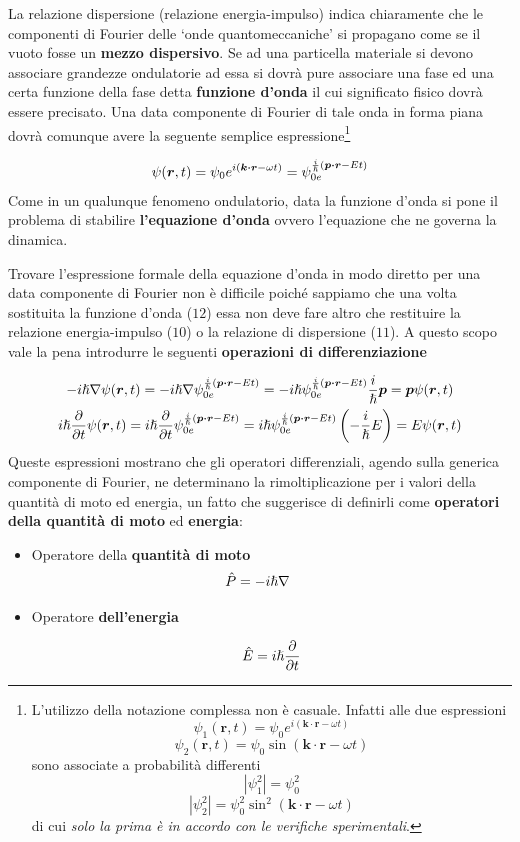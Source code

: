La relazione dispersione (relazione energia-impulso) indica chiaramente
che le componenti di Fourier delle `onde quantomeccaniche' si propagano
come se il vuoto fosse un \textbf{mezzo dispersivo}.
Se ad una particella materiale si devono associare grandezze ondulatorie
ad essa si dovrà pure associare una fase ed una certa funzione della
fase detta \textbf{funzione d'onda} il cui significato fisico dovrà
essere precisato.
Una data componente di Fourier di tale onda in forma
piana dovrà comunque avere la seguente semplice espressione\footnote{L'utilizzo
della notazione complessa non è casuale. Infatti alle due espressioni
	\[
		\psi_1(\bm{r},t) = \psi_0 e^{i(\bm{k \cdot r}-\omega t)}
	\] \[
		\psi_2(\bm{r},t) = \psi_0 \sin (\bm{k \cdot r}-\omega t)
	\] sono associate a probabilità differenti \[
		| \psi_1^2| = \psi_0^2
	\] \[
		| \psi_2^2| = \psi_0^2 \sin^2(\bm{k \cdot r}-\omega t)
	\] di cui \emph{solo la prima è in accordo con le verifiche sperimentali}.}


\begin{equation}
	\psi(\bm{r},t) = \psi_0 e^{i(\bm{k \cdot r}-\omega t)} = \psi_{0e}^{\frac{i}{\hslash}(\bm{p \cdot r}-E t)}
\end{equation}
Come in un qualunque fenomeno ondulatorio, data la
funzione d'onda si pone il problema di stabilire \textbf{l'equazione
d'onda} ovvero l'equazione che ne governa la dinamica.

Trovare l'espressione formale della equazione d'onda in modo diretto per
una data componente di Fourier non è difficile poiché sappiamo che una
volta sostituita la funzione d'onda (\(12\)) essa non deve fare altro
che restituire la relazione energia-impulso (\(10\)) o la relazione di
dispersione (\(11\)).
A questo scopo vale la pena introdurre le seguenti \textbf{operazioni di differenziazione}

\begin{gather*}
	- i \hslash \nabla \psi (\bm{r},t) = - i \hslash \nabla \psi_{0e}^{\frac{i}{\hslash}(\bm{p \cdot r}-E t)} = - i \hslash \psi_{0e}^{\frac{i}{\hslash}(\bm{p \cdot r}-E t)} \frac{i}{\hslash} \bm{p} = \bm{p}\psi(\bm{r},t)\\
	i \hslash \frac{\partial}{\partial t} \psi (\bm{r},t) =  i \hslash \frac{\partial}{\partial t} \psi_{0e}^{\frac{i}{\hslash}(\bm{p \cdot r}-E t)} =  i \hslash \psi_{0e}^{\frac{i}{\hslash}(\bm{p \cdot r}-E t)} \left( - \frac{i}{\hslash} E\right) = E\psi(\bm{r},t)\\
\end{gather*}
Queste espressioni mostrano che gli operatori differenziali, agendo
sulla generica componente di Fourier, ne determinano la
rimoltiplicazione per i valori della quantità di moto ed energia, un
fatto che suggerisce di definirli come \textbf{operatori della quantità
di moto} ed \textbf{energia}:
\begin{itemize}
	\item
	Operatore della \textbf{quantità di moto}
	\[
	   \hat{P} = - i \hslash \nabla    \qquad
	\]
	\item
	Operatore \textbf{dell'energia}

	\[
		\hat{E} = i \hslash \frac{\partial}{\partial t}
	\]
\end{itemize}

